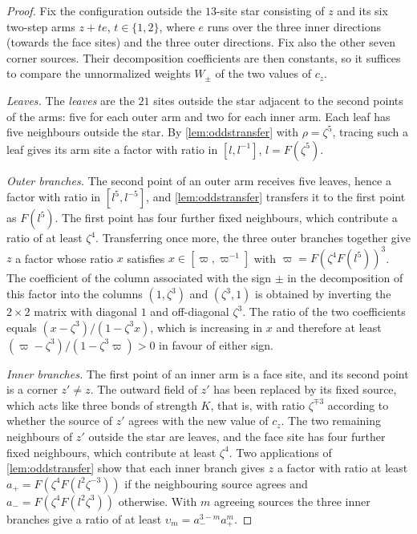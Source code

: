 \begin{proof}
Fix the configuration outside the $13$-site star consisting of $z$ and its six two-step arms $z+te$, $t\in\{1,2\}$, where $e$ runs over the three inner directions (towards the face sites) and the three outer directions. Fix also the other seven corner sources. Their decomposition coefficients are then constants, so it suffices to compare the unnormalized weights $W_\pm$ of the two values of $c_z$.

\emph{Leaves.} The \emph{leaves} are the $21$ sites outside the star adjacent to the second points of the arms: five for each outer arm and two for each inner arm. Each leaf has five neighbours outside the star. By \cref{lem:oddstransfer} with $\rho=\zeta^5$, tracing such a leaf gives its arm site a factor with ratio in $[l,l^{-1}]$, $l=F(\zeta^5)$.

\emph{Outer branches.} The second point of an outer arm receives five leaves, hence a factor with ratio in $[l^5,l^{-5}]$, and \cref{lem:oddstransfer} transfers it to the first point as $F(l^5)$. The first point has four further fixed neighbours, which contribute a ratio of at least $\zeta^4$. Transferring once more, the three outer branches together give $z$ a factor whose ratio $x$ satisfies $x\in[\varpi,\varpi^{-1}]$ with $\varpi=F(\zeta^4F(l^5))^3$. The coefficient of the column associated with the sign $\pm$ in the decomposition of this factor into the columns $(1,\zeta^3)$ and $(\zeta^3,1)$ is obtained by inverting the $2\times2$ matrix with diagonal $1$ and off-diagonal $\zeta^3$. The ratio of the two coefficients equals $(x-\zeta^3)/(1-\zeta^3x)$, which is increasing in $x$ and therefore at least $(\varpi-\zeta^3)/(1-\zeta^3\varpi)>0$ in favour of either sign.

\emph{Inner branches.} The first point of an inner arm is a face site, and its second point is a corner $z'\ne z$. The outward field of $z'$ has been replaced by its fixed source, which acts like three bonds of strength $K$, that is, with ratio $\zeta^{\mp3}$ according to whether the source of $z'$ agrees with the new value of $c_z$. The two remaining neighbours of $z'$ outside the star are leaves, and the face site has four further fixed neighbours, which contribute at least $\zeta^4$. Two applications of \cref{lem:oddstransfer} show that each inner branch gives $z$ a factor with ratio at least $a_+=F(\zeta^4F(l^2\zeta^{-3}))$ if the neighbouring source agrees and $a_-=F(\zeta^4F(l^2\zeta^{3}))$ otherwise. With $m$ agreeing sources the three inner branches give a ratio of at least $\upsilon_m=a_-^{3-m}a_+^m$.


\end{proof}
